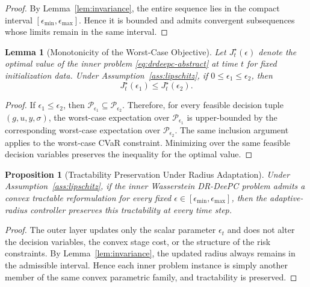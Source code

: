 \documentclass[conference]{IEEEtran}
\newtheorem{lemma}{Lemma}
\newtheorem{proposition}{Proposition}
\begin{document}
\begin{proof}
By Lemma~\ref{lem:invariance}, the entire sequence lies in the compact interval $[\epsilon_{\min},\epsilon_{\max}]$. Hence it is bounded and admits convergent subsequences whose limits remain in the same interval.
\end{proof}

\begin{lemma}[Monotonicity of the Worst-Case Objective]
\label{lem:objective-monotone}
Let $J_t^\star(\epsilon)$ denote the optimal value of the inner problem \eqref{eq:drdeepc-abstract} at time $t$ for fixed initialization data. Under Assumption~\ref{ass:lipschitz}, if $0 \le \epsilon_1 \le \epsilon_2$, then
\begin{equation}
J_t^\star(\epsilon_1)\le J_t^\star(\epsilon_2).
\end{equation}
\end{lemma}

\begin{proof}
If $\epsilon_1 \le \epsilon_2$, then $\mathcal{P}_{\epsilon_1}\subseteq \mathcal{P}_{\epsilon_2}$. Therefore, for every feasible decision tuple $(g,u,y,\sigma)$, the worst-case expectation over $\mathcal{P}_{\epsilon_1}$ is upper-bounded by the corresponding worst-case expectation over $\mathcal{P}_{\epsilon_2}$. The same inclusion argument applies to the worst-case CVaR constraint. Minimizing over the same feasible decision variables preserves the inequality for the optimal value.
\end{proof}

\begin{proposition}[Tractability Preservation Under Radius Adaptation]
\label{prop:tractability}
Under Assumption~\ref{ass:lipschitz}, if the inner Wasserstein DR-DeePC problem admits a convex tractable reformulation for every fixed $\epsilon \in [\epsilon_{\min},\epsilon_{\max}]$, then the adaptive-radius controller preserves this tractability at every time step.
\end{proposition}

\begin{proof}
The outer layer updates only the scalar parameter $\epsilon_t$ and does not alter the decision variables, the convex stage cost, or the structure of the risk constraints. By Lemma~\ref{lem:invariance}, the updated radius always remains in the admissible interval. Hence each inner problem instance is simply another member of the same convex parametric family, and tractability is preserved.
\end{proof}
\end{document}
